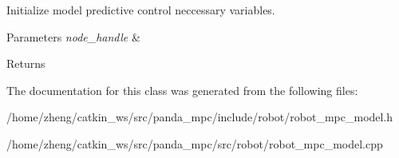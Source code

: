 Initialize model predictive control neccessary variables. 


\begin{DoxyParams}{Parameters}
{\em node\+\_\+handle} & \\
\hline
\end{DoxyParams}
\begin{DoxyReturn}{Returns}

\end{DoxyReturn}


The documentation for this class was generated from the following files\+:\begin{DoxyCompactItemize}
\item 
/home/zheng/catkin\+\_\+ws/src/panda\+\_\+mpc/include/robot/robot\+\_\+mpc\+\_\+model.\+h\item 
/home/zheng/catkin\+\_\+ws/src/panda\+\_\+mpc/src/robot/robot\+\_\+mpc\+\_\+model.\+cpp\end{DoxyCompactItemize}

